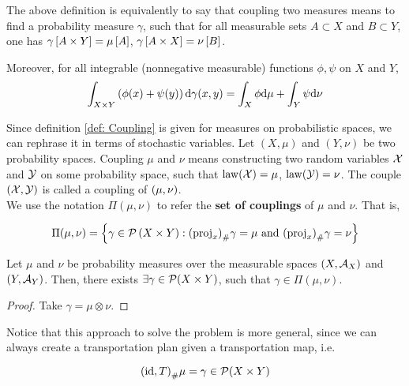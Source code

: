 The above definition is equivalently to say that coupling two measures means to find a probability measure $\gamma$, such that for all measurable sets $A\subset X$ and $B\subset Y$, one has $\gamma\left[ A\times Y \right]=\mu\left[ A \right]$, $\gamma\left[ A\times X \right]=\nu\left[ B \right]$.

Moreover, for all integrable (nonnegative measurable) functions $\phi, \psi$ on $X$ and $Y$,
\begin{equation*}
	\int_{X\times Y}\left( \phi(x)+\psi(y) \right)\mathrm{d}\gamma(x,y)=\int_{X}\phi\mathrm{d}\mu+\int_{Y}\psi\mathrm{d}\nu
\end{equation*}

Since definition \ref{def: Coupling} is given for measures on probabilistic spaces, we can rephrase it in terms of stochastic variables. Let $(X, \mu)$ and $(Y, \nu)$ be two probability spaces. Coupling $\mu$ and $\nu$ means constructing two random variables $\mathcal{X}$ and $\mathcal{Y}$ on some probability space, such that $\mathrm{law}(\mathcal{X})=\mu$, $\mathrm{law}(\mathcal{Y})=\nu$. The couple $\left( \mathcal{X},\mathcal{Y} \right)$ is called a coupling of $\left( \mu, \nu \right)$. \\


We use the notation $\Pi(\mu, \nu)$ to refer the \textbf{set of couplings} of $\mu$ and $\nu$. That is,

\begin{equation}
\Pi(\mu, \nu)=\braces{\gamma \in \PlanSp\parentheses{X\times Y}: \Tmeasure{\gamma}{\parentheses{\proj_x}}=\mu \ \mand \ \Tmeasure{\gamma}{\parentheses{\proj_x}}=\nu}
\end{equation}

\begin{lemma}
	\label{lm: Existence of a coupling}
Let $\mu$ and $\nu$ be probability measures over the measurable spaces $\left( X, \mathcal{A}_X \right)$ and $\left( Y, \mathcal{A}_Y \right)$. Then, there exists  $\exists \gamma \in \mathcal{P}(X\times Y)$, such that $\gamma\in\Pi(\mu, \nu)$.
\end{lemma}
\begin{proof}
	Take $\gamma=\mu\otimes\nu$.
\end{proof}


Notice that this approach to solve the problem is more general, since we can always create a transportation plan given a transportation map, i.e.

\begin{equation*}
{(\mathrm{id}, T)}_{\#} \mu=\gamma \in \mathcal{P}(X\times Y)
\end{equation*}

